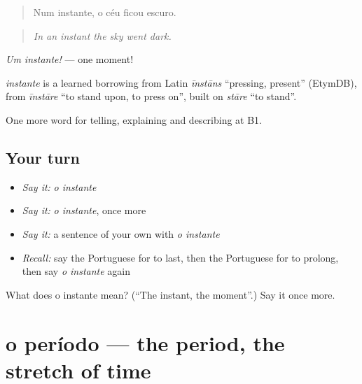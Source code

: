 \begin{quote}
Num instante, o céu ficou escuro.
\end{quote}

\begin{quote}
\emph{In an instant the sky went dark.}
\end{quote}

\emph{Um instante!} — one moment!

\begin{cousinweb}
\emph{instante} is a learned borrowing from Latin \emph{īnstāns} \textquotedblleft{}pressing, present\textquotedblright{} (EtymDB), from \emph{īnstāre} \textquotedblleft{}to stand upon, to press on\textquotedblright{}, built on \emph{stāre} \textquotedblleft{}to stand\textquotedblright{}.
\end{cousinweb}

\begin{grammarlens}[title={What you've built}]
One more word for telling, explaining and describing at B1.
\end{grammarlens}

\subsection*{Your turn}
\begin{itemize}
\raggedright
  \item \emph{Say it:} \emph{o instante}
  \item \emph{Say it:} \emph{o instante}, once more
  \item \emph{Say it:} a sentence of your own with \emph{o instante}
  \item \emph{Recall:} say the Portuguese for to last, then the Portuguese for to prolong, then say \emph{o instante} again
\end{itemize}

\begin{tcolorbox}[breakable,colback=teal!4,colframe=teal!35!black,title={Before you move on}]
What does o instante mean? (\textquotedblleft{}The instant, the moment\textquotedblright{}.) Say it once more.
\end{tcolorbox}
\section[o período]{o período — the period, the stretch of time}

\label{lesson:PT-C272-periodo}




